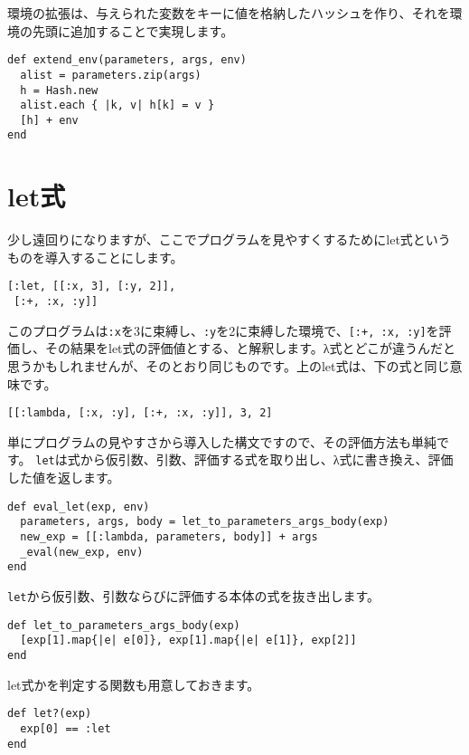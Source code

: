 環境の拡張は、与えられた変数をキーに値を格納したハッシュを作り、それを環境の先頭に追加することで実現します。

\begin{lstlisting}
def extend_env(parameters, args, env)
  alist = parameters.zip(args)
  h = Hash.new
  alist.each { |k, v| h[k] = v }
  [h] + env
end
\end{lstlisting}

\section{let式}

少し遠回りになりますが、ここでプログラムを見やすくするためにlet式というものを導入することにします。

\begin{lstlisting}
[:let, [[:x, 3], [:y, 2]],
 [:+, :x, :y]]
\end{lstlisting}

このプログラムは{\tt :x}を3に束縛し、{\tt :y}を2に束縛した環境で、{\tt [:+, :x, :y]}を評価し、その結果をlet式の評価値とする、と解釈します。λ式とどこが違うんだと思うかもしれませんが、そのとおり同じものです。上のlet式は、下の式と同じ意味です。

\begin{lstlisting}
[[:lambda, [:x, :y], [:+, :x, :y]], 3, 2]
\end{lstlisting}

単にプログラムの見やすさから導入した構文ですので、その評価方法も単純です。
{\tt let}は式から仮引数、引数、評価する式を取り出し、λ式に書き換え、評価した値を返します。

\begin{lstlisting}
def eval_let(exp, env)
  parameters, args, body = let_to_parameters_args_body(exp)
  new_exp = [[:lambda, parameters, body]] + args
  _eval(new_exp, env)
end
\end{lstlisting}

{\tt let}から仮引数、引数ならびに評価する本体の式を抜き出します。

\begin{lstlisting}
def let_to_parameters_args_body(exp)
  [exp[1].map{|e| e[0]}, exp[1].map{|e| e[1]}, exp[2]]
end
\end{lstlisting}

let式かを判定する関数も用意しておきます。

\begin{lstlisting}
def let?(exp)
  exp[0] == :let
end
\end{lstlisting}

